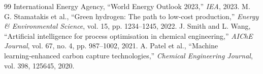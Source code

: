 \documentclass[conference]{IEEEtran}
\begin{document}
\begin{thebibliography}{99}
International Energy Agency, ``World Energy Outlook 2023,'' \textit{IEA}, 2023.
M. G. Stamatakis et al., ``Green hydrogen: The path to low‑cost production,'' \textit{Energy \& Environmental Science}, vol. 15, pp. 1234–1245, 2022.
J. Smith and L. Wang, ``Artificial intelligence for process optimisation in chemical engineering,'' \textit{AIChE Journal}, vol. 67, no. 4, pp. 987–1002, 2021.
A. Patel et al., ``Machine learning‑enhanced carbon capture technologies,'' \textit{Chemical Engineering Journal}, vol. 398, 125645, 2020.
\end{thebibliography}
\end{document}
